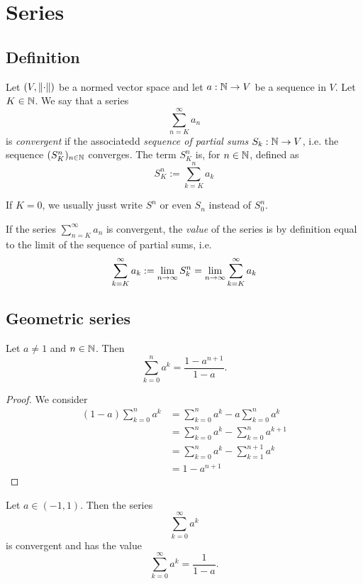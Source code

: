 \section{Series}

\subsection{Definition}
\begin{definition}
    Let $(V, \norm{\cdot})$ be a normed vector space and let $a: \mathbb{N} \to V$ be a sequence in $V$. Let $K \in \mathbb{N}$. We say that a series
    $$\sum_{n=K}^{\infty}a_n$$
    is \emph{convergent} if the associatedd \emph{sequence of partial sums} $S_k:\mathbb{N} \to V$, i.e. the sequence $(S_K^n)_{n\in\mathbb{N}}$ converges. The term $S_K^n$ is, for $n \in \mathbb{N}$, defined as
    $$S_K^n:= \sum_{k=K}^na_k$$

    If $K = 0$, we usually jusst write $S^n$ or even $S_n$ instead of $S_0^n$.

    If the series $\sum_{n=K}^\infty a_n$ is convergent, the \emph{value} of the series is by definition equal to the limit of  the sequence of partial sums, i.e.
    $$\sum_{k=K}^\infty a_k := \lim_{n\to\infty} S_k^n = \lim_{n\to\infty} \sum_{k=K}^\infty a_k$$
\end{definition}

\subsection{Geometric series}
\begin{proposition}
    Let $a \ne 1$ and $n \in \mathbb{N}$. Then
    $$\sum_{k=0}^n a^k = \frac{1-a^{n+1}}{1-a}.$$
\end{proposition}
\begin{proof}
    We consider
    \begin{align*}
        (1-a)\sum_{k=0}^n a^k &= \sum_{k=0}^n a^k - a\sum_{k=0}^n a^k  \\
                              &= \sum_{k=0}^n a^k - \sum_{k=0}^n a^{k+1} \\
                              &= \sum_{k=0}^n a^k - \sum_{k=1}^{n+1} a^k \\
                              &= 1 - a^{n+1}
    \end{align*}
\end{proof}

\begin{proposition}
    Let $a \in (-1,1)$. Then the series
    $$\sum_{k=0}^\infty a^k$$
    is convergent and has the value
    $$\sum_{k=0}^\infty a^k = \frac{1}{1-a}.$$
\end{proposition}

